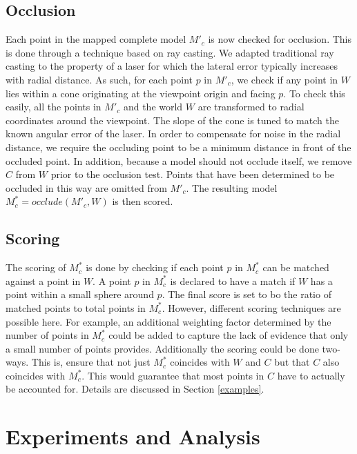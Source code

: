 \documentclass[letterpaper, 10pt, conference]{ieeeconf}
\begin{document}
\subsection{Occlusion}
\label{occlusions}
Each point in the mapped complete model $M'_c$ is now checked for occlusion.
This is done through a technique based on ray casting. We adapted traditional ray
casting to the property of a laser for which the lateral error
typically increases with radial distance. As such, for each point $p$ in $M'_c$,
we check if any point in $W$ lies within a cone originating at the viewpoint origin and facing $p$. 
To check this easily, all the points in $M'_c$ and the world $W$ are transformed to radial coordinates 
around the viewpoint. The slope of the cone is tuned to match the known angular error of the laser. In order to compensate for noise in the radial distance, we require the occluding point to be a minimum distance in front of the occluded point. In addition, because a model should not occlude itself, we remove $C$ from $W$ prior to the occlusion test. Points that have been determined to be occluded in this way are omitted from $M'_c$. The resulting model $M^*_c = {occlude}(M'_c,W)$ is then scored.


\subsection{Scoring}
\label{scoring}
The scoring of $M^*_c$ is done by checking if each point $p$ in $M^*_c$ can be
matched against a point in $W$. A point $p$ in $M^*_c$ is declared to have a
match if $W$ has a point within a small sphere around $p$. The final score is
set to bo the ratio of matched points to total points in $M^*_c$. However,
different scoring techniques are possible here. For example, an additional weighting factor
determined by the number of points in $M^*_c$ could be added to capture the lack of 
evidence that only a small number of points provides. Additionally the scoring
could be done two-ways. This is, ensure that not just $M^*_c$ coincides with $W$
and $C$ but that $C$ also coincides with $M^*_c$. This would guarantee that most points in $C$ have to actually be accounted for. 
Details are discussed in Section \ref{examples}.


\section{Experiments and Analysis}
\label{experiments}
\end{document}
